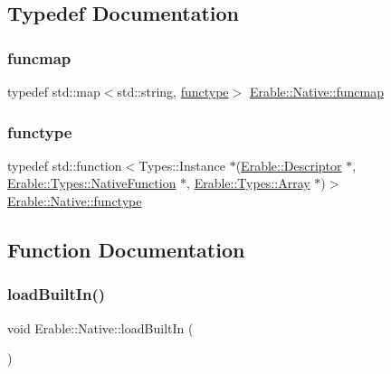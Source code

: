 \subsection{Typedef Documentation}
\mbox{\label{namespace_erable_1_1_native_a6b24cdc21d4331b17b20ec0d3ed9e851}} 
\subsubsection{\texorpdfstring{funcmap}{funcmap}}
{\footnotesize\ttfamily typedef std\+::map$<$std\+::string, \mbox{\hyperlink{namespace_erable_1_1_native_ad05719f34b3261ec6ed5ae50fdc188a5}{functype}}$>$ \mbox{\hyperlink{namespace_erable_1_1_native_a6b24cdc21d4331b17b20ec0d3ed9e851}{Erable\+::\+Native\+::funcmap}}}

\mbox{\label{namespace_erable_1_1_native_ad05719f34b3261ec6ed5ae50fdc188a5}} 
\subsubsection{\texorpdfstring{functype}{functype}}
{\footnotesize\ttfamily typedef std\+::function$<$Types\+::\+Instance $\ast$(\mbox{\hyperlink{class_erable_1_1_descriptor}{Erable\+::\+Descriptor}} $\ast$, \mbox{\hyperlink{class_erable_1_1_erable_1_1_types_1_1_native_function}{Erable\+::\+Types\+::\+Native\+Function}} $\ast$, \mbox{\hyperlink{class_erable_1_1_erable_1_1_types_1_1_array}{Erable\+::\+Types\+::\+Array}} $\ast$)$>$ \mbox{\hyperlink{namespace_erable_1_1_native_ad05719f34b3261ec6ed5ae50fdc188a5}{Erable\+::\+Native\+::functype}}}



\subsection{Function Documentation}
\mbox{\label{namespace_erable_1_1_native_a9fe618a87317177880c4bb97af520e2a}} 
\subsubsection{\texorpdfstring{loadBuiltIn()}{loadBuiltIn()}}
{\footnotesize\ttfamily void Erable\+::\+Native\+::load\+Built\+In (\begin{DoxyParamCaption}{ }\end{DoxyParamCaption})}


